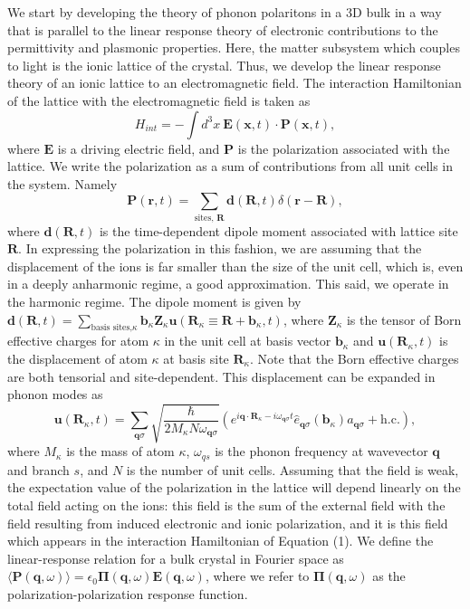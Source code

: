 \documentclass[superscriptaddress,reprint,prb]{revtex4-1}
\begin{document}
We start by developing the theory of phonon polaritons in a 3D bulk in a way that is parallel to the linear response theory of electronic contributions to the permittivity and plasmonic properties. Here, the matter subsystem which couples to light is the ionic lattice of the crystal. Thus, we develop the linear response theory of an ionic lattice to an electromagnetic field. The interaction Hamiltonian of the lattice with the electromagnetic field is taken as
\begin{equation}
H_{int} = -\int d^3x ~\mathbf{E}(\mathbf{x},t)\cdot\mathbf{P}(\mathbf{x},t),
\end{equation}
where $\mathbf{E}$ is a driving electric field, and $\mathbf{P}$ is the polarization associated with the lattice. We write the polarization as a sum of contributions from all unit cells in the system. Namely
\begin{equation}
\mathbf{P}(\mathbf{r},t) = \sum\limits_{\text{sites, }\mathbf{R}}\mathbf{d}(\mathbf{R},t)\delta(\mathbf{r}-\mathbf{R}),
\end{equation}
where $\mathbf{d}(\mathbf{R},t)$ is the time-dependent dipole moment associated with lattice site $\mathbf{R}$. In expressing the polarization in this fashion, we are assuming that the displacement of the ions is far smaller than the size of the unit cell, which is, even in a deeply anharmonic regime, a good approximation. This said, we operate in the harmonic regime.  The dipole moment is given by $\mathbf{d}(\mathbf{R},t) = \sum\limits_{\text{basis sites,}\kappa} \mathbf{b}_{\kappa} \mathbf{Z}_{\kappa}\mathbf{u}(\mathbf{R}_{\kappa} \equiv \mathbf{R}+\mathbf{b}_{\kappa},t)$, where $\mathbf{Z}_{\kappa}$ is the tensor of Born effective charges for atom $\kappa$ in the unit cell at basis vector $\mathbf{b}_{\kappa}$ and $\mathbf{u}(\mathbf{R}_{\kappa},t)$ is the displacement of atom $\kappa$ at basis site $\mathbf{R}_{\kappa}$. Note that the Born effective charges are both tensorial and site-dependent.  This displacement can be expanded in phonon modes as
\begin{equation}
\mathbf{u}(\mathbf{R}_{\kappa},t) = \sum\limits_{\mathbf{q}\sigma}\sqrt{\frac{\hbar}{2M_{\kappa}N\omega_{\mathbf{q}\sigma}}}\left( e^{i\mathbf{q}\cdot\mathbf{R}_{\kappa}-i\omega_{\mathbf{q}\sigma}t}\hat{e}_{\mathbf{q}\sigma}(\mathbf{b}_{\kappa})a_{\mathbf{q}\sigma} + \text{h.c.} \right),
\end{equation}
where $M_{\kappa}$ is the mass of atom $\kappa$, $\omega_{qs}$ is the phonon frequency at wavevector $\mathbf{q}$ and branch $s$, and $N$ is the number of unit cells.
Assuming that the field is weak, the expectation value of the polarization in the lattice will depend linearly on the total field acting on the ions: this field is the sum of the external field with the field resulting from induced electronic and ionic polarization, and it is this field which appears in the interaction Hamiltonian of Equation (1). We define the linear-response relation for a bulk crystal in Fourier space as $\langle\mathbf{P}(\mathbf{q},\omega)\rangle = \epsilon_0\boldsymbol{\Pi}(\mathbf{q},\omega)\mathbf{E}(\mathbf{q},\omega)$, where we refer to $\boldsymbol{\Pi}(\mathbf{q},\omega)$ as the polarization-polarization response function.
\end{document}
